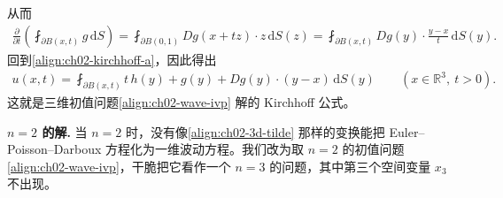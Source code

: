 \documentclass[../../main.tex]{subfiles}
\begin{document}
从而
\begin{align*}
\frac{\partial}{\partial t}\left(\fint_{\partial B(x,t)}g\,\mathrm{d}S\right)=\fint_{\partial B(0,1)}Dg(x+tz)\cdot z\,\mathrm{d}S(z)
=\fint_{\partial B(x,t)}Dg(y)\cdot\frac{y-x}{t}\,\mathrm{d}S(y).
\end{align*}
回到\eqref{align:ch02-kirchhoff-a}，因此得出
\begin{align}\label{align:ch02-kirchhoff}
u(x,t)=\fint_{\partial B(x,t)}t\,h(y)+g(y)+Dg(y)\cdot(y-x)\,\mathrm{d}S(y) \qquad (x\in\mathbb{R}^3,\ t>0).
\end{align}
这就是三维初值问题\eqref{align:ch02-wave-ivp} 解的 Kirchhoff 公式。

\textbf{$n=2$ 的解.} 当 $n=2$ 时，没有像\eqref{align:ch02-3d-tilde} 那样的变换能把 Euler--Poisson--Darboux 方程化为一维波动方程。我们改为取 $n=2$ 的初值问题\eqref{align:ch02-wave-ivp}，干脆把它看作一个 $n=3$ 的问题，其中第三个空间变量 $x_3$ 不出现。
\end{document}
